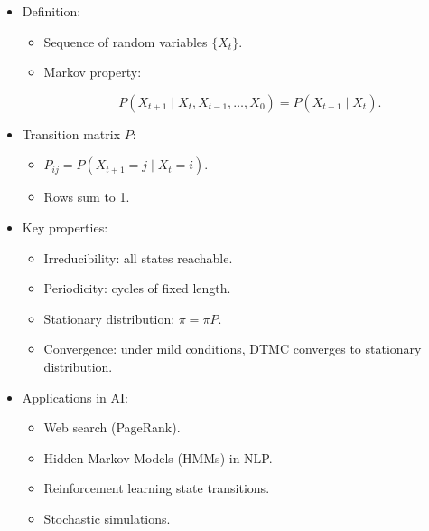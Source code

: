\documentclass[
  letterpaper,
  DIV=11,
  numbers=noendperiod]{scrreprt}
\providecommand{\tightlist}{%
  \setlength{\itemsep}{0pt}\setlength{\parskip}{0pt}}
\begin{document}
\begin{itemize}
\item
  Definition:

  \begin{itemize}
  \item
    Sequence of random variables \(\{X_t\}\).
  \item
    Markov property:

    \[
    P(X_{t+1} \mid X_t, X_{t-1}, \dots, X_0) = P(X_{t+1} \mid X_t).
    \]
  \end{itemize}
\item
  Transition matrix \(P\):

  \begin{itemize}
  \tightlist
  \item
    \(P_{ij} = P(X_{t+1}=j \mid X_t=i)\).
  \item
    Rows sum to 1.
  \end{itemize}
\item
  Key properties:

  \begin{itemize}
  \tightlist
  \item
    Irreducibility: all states reachable.
  \item
    Periodicity: cycles of fixed length.
  \item
    Stationary distribution: \(\pi = \pi P\).
  \item
    Convergence: under mild conditions, DTMC converges to stationary
    distribution.
  \end{itemize}
\item
  Applications in AI:

  \begin{itemize}
  \tightlist
  \item
    Web search (PageRank).
  \item
    Hidden Markov Models (HMMs) in NLP.
  \item
    Reinforcement learning state transitions.
  \item
    Stochastic simulations.
  \end{itemize}
\end{itemize}
\end{document}
